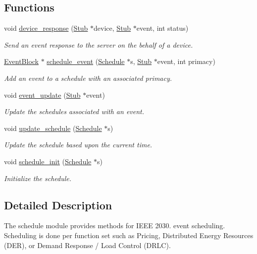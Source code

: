 \subsection*{Functions}
\begin{DoxyCompactItemize}
\item 
void \hyperlink{group__schedule_ga9d4cd083882e87732612850c3250ffbf}{device\+\_\+response} (\hyperlink{structStub}{Stub} $\ast$device, \hyperlink{structStub}{Stub} $\ast$event, int status)
\begin{DoxyCompactList}\small\item\em Send an event response to the server on the behalf of a device. \end{DoxyCompactList}\item 
\hyperlink{structEventBlock}{Event\+Block} $\ast$ \hyperlink{group__schedule_gadabb3fc64df947b899dc1c69b19cc387}{schedule\+\_\+event} (\hyperlink{structSchedule}{Schedule} $\ast$s, \hyperlink{structStub}{Stub} $\ast$event, int primacy)
\begin{DoxyCompactList}\small\item\em Add an event to a schedule with an associated primacy. \end{DoxyCompactList}\item 
void \hyperlink{group__schedule_gaf04a182093aa4cb92a4ee5d2617197fd}{event\+\_\+update} (\hyperlink{structStub}{Stub} $\ast$event)
\begin{DoxyCompactList}\small\item\em Update the schedules associated with an event. \end{DoxyCompactList}\item 
void \hyperlink{group__schedule_gabd767b69f0c96529550af0593e8efe75}{update\+\_\+schedule} (\hyperlink{structSchedule}{Schedule} $\ast$s)
\begin{DoxyCompactList}\small\item\em Update the schedule based upon the current time. \end{DoxyCompactList}\item 
void \hyperlink{group__schedule_ga69ef66c1e814d8296384803a0da27d4a}{schedule\+\_\+init} (\hyperlink{structSchedule}{Schedule} $\ast$s)
\begin{DoxyCompactList}\small\item\em Initialize the schedule. \end{DoxyCompactList}\end{DoxyCompactItemize}


\subsection{Detailed Description}
The schedule module provides methods for I\+E\+EE 2030. event scheduling. Scheduling is done per function set such as Pricing, Distributed Energy Resources (D\+ER), or Demand Response / Load Control (D\+R\+LC).

